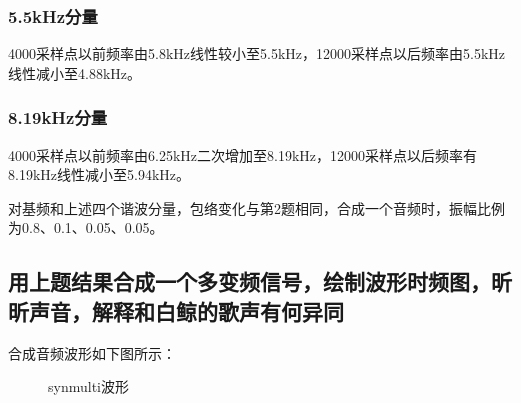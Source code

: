 \documentclass{article}
\begin{document}
            \subsubsection*{5.5kHz分量}
                4000采样点以前频率由5.8kHz线性较小至5.5kHz，12000采样点以后频率由5.5kHz线性减小至4.88kHz。
            \subsubsection*{8.19kHz分量}
                4000采样点以前频率由6.25kHz二次增加至8.19kHz，12000采样点以后频率有8.19kHz线性减小至5.94kHz。
            
            对基频和上述四个谐波分量，包络变化与第2题相同，合成一个音频时，振幅比例为0.8、0.1、0.05、0.05。
            
        \subsection{用上题结果合成一个多变频信号，绘制波形时频图，昕昕声音，解释和白鲸的歌声有何异同}
            合成音频波形如下图所示：
            \begin{figure}[htb]
                \centering
                \hspace{10pt}
                \caption{synmulti波形}
                \label{fig:synmulti}
            \end{figure}
\end{document}
